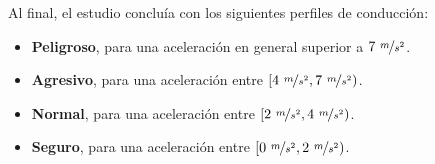 Al final, el estudio concluía con los siguientes perfiles de conducción:

\begin{itemize}
  \item \textbf{Peligroso}, para una aceleración en general superior a $7\ \nicefrac{m}{s^2}$.
  \item \textbf{Agresivo}, para una aceleración entre $\left[4\ \nicefrac{m}{s^2}, 7\ \nicefrac{m}{s^2}\right)$.
  \item \textbf{Normal}, para una aceleración entre $\left[2\ \nicefrac{m}{s^2}, 4\ \nicefrac{m}{s^2}\right)$.
  \item \textbf{Seguro}, para una aceleración entre $\left[0\ \nicefrac{m}{s^2}, 2\ \nicefrac{m}{s^2}\right)$.
\end{itemize}
